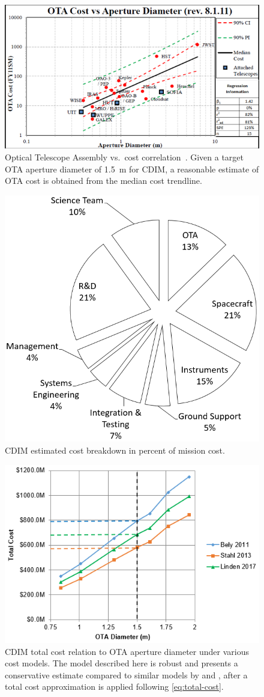 \documentclass{ws-jai}
\begin{document}
\begin{figure}[!h]
    \centering
    \includegraphics[width=.8\linewidth]{figs/ota_cost-diameter_stahl2010.png}
    \caption{Optical Telescope Assembly vs.\ cost correlation~\cite{stahl2013}. Given a target OTA aperture diameter of \SI{1.5}{\meter} for CDIM, a reasonable estimate of OTA cost is obtained from the median cost trendline.
\label{fig:cost-stahl-ota-cost-vs-diameter}
}
\end{figure}

\begin{figure}[!h]
  \centering
    \centering
    \includegraphics[width=.6\linewidth]{figs/cost-breakdown-pie.png}
    \caption{CDIM estimated cost breakdown in percent of mission cost.
\label{fig:cost-breakdown}
}
\end{figure}

\begin{figure}[!h]
  \centering
  \includegraphics[width=.6\linewidth]{figs/total-cost-vs-diameter.png}
  \caption{CDIM total cost relation to OTA aperture diameter under various cost models. The model described here is robust and presents a conservative estimate compared to similar models by \citeauthor{bely2011} and \citeauthor{stahl2013}, after a total cost approximation is applied following \autoref{eq:total-cost}.
\label{fig:cost-total-compare-models}
}
\end{figure}
\end{document}
